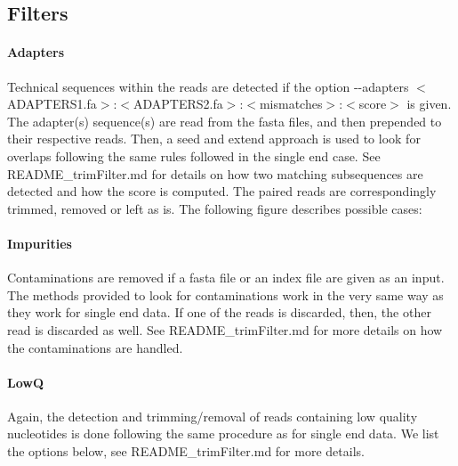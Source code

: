 \subsection*{Filters}

\paragraph*{Adapters}

Technical sequences within the reads are detected if the option {\ttfamily -\/-\/adapters $<$A\+D\+A\+P\+T\+E\+R\+S1.\+fa$>$\+:$<$A\+D\+A\+P\+T\+E\+R\+S2.\+fa$>$\+:$<$mismatches$>$\+:$<$score$>$} is given. The adapter(s) sequence(s) are read from the fasta files, and then prepended to their respective reads. Then, a \textquotesingle{}seed and extend\textquotesingle{} approach is used to look for overlaps following the same rules followed in the single end case. See {\ttfamily R\+E\+A\+D\+M\+E\+\_\+trim\+Filter.\+md} for details on how two matching subsequences are detected and how the score is computed. The paired reads are correspondingly trimmed, removed or left as is. The following figure describes possible cases\+:

 

\paragraph*{Impurities}

Contaminations are removed if a fasta file or an index file are given as an input. The methods provided to look for contaminations work in the very same way as they work for single end data. If one of the reads is discarded, then, the other read is discarded as well. See {\ttfamily R\+E\+A\+D\+M\+E\+\_\+trim\+Filter.\+md} for more details on how the contaminations are handled.

\paragraph*{LowQ}

Again, the detection and trimming/removal of reads containing low quality nucleotides is done following the same procedure as for single end data. We list the options below, see {\ttfamily R\+E\+A\+D\+M\+E\+\_\+trim\+Filter.\+md} for more details.



